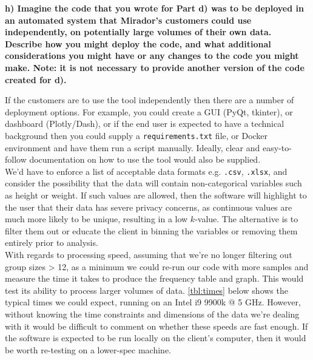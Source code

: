 \documentclass{article}
\begin{document}
\vspace{\baselineskip}

\textbf{h) Imagine the code that you wrote for Part d) was to be deployed in an automated system that Mirador's customers could use independently, on potentially large volumes of their own data. Describe how you might deploy the code, and what additional considerations you might have or any changes to the code you might make. Note: it is not necessary to provide another version of the code created for d).}


\vspace{\baselineskip}


If the customers are to use the tool independently then there are a number of deployment options. For example, you could create a GUI (PyQt, tkinter), or dashboard (Plotly/Dash), or if the end user is expected to have a technical background then you could supply a \texttt{requirements.txt} file, or Docker environment and have them run a script manually. 
Ideally, clear and easy-to-follow documentation on how to use the tool would also be supplied.\\


We'd have to enforce a list of acceptable data formats e.g. \texttt{.csv}, \texttt{.xlsx}, and consider the possibility that the data will contain non-categorical variables such as height or weight. 
If such values are allowed, then the software will highlight to the user that their data has severe privacy concerns, as continuous values are much more likely to be unique, resulting in a low $k$-value.
The alternative is to filter them out or educate the client in binning the variables or removing them entirely prior to analysis. \\


With regards to processing speed, assuming that we're no longer filtering out group sizes > 12, as a minimum we could re-run our code with more samples and measure the time it takes to produce the frequency table and graph. This would test its ability to process larger volumes of data. \cref{tbl:times} below shows the typical times we could expect, running on an Intel i9 9900k @ 5 GHz. However, without knowing the time constraints and dimensions of the data we're dealing with it would be difficult to comment on whether these speeds are fast enough. If the software is expected to be run locally on the client's computer, then it would be worth re-testing on a lower-spec machine. 
\end{document}
